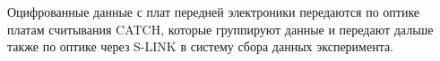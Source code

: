 
Оцифрованные данные с плат передней электроники передаются по оптике платам считывания CATCH, которые группируют данные и передают дальше также по оптике через S-LINK в систему сбора данных эксперимента.




